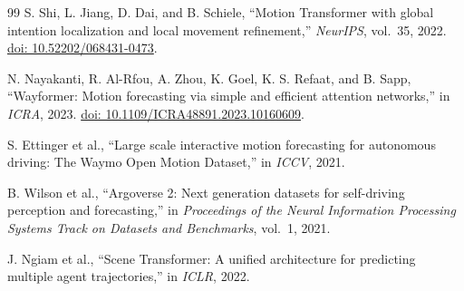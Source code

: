 \documentclass[11pt,letterpaper]{article}
\begin{document}
\begin{thebibliography}{99}
S. Shi, L. Jiang, D. Dai, and B. Schiele,
``Motion Transformer with global intention localization and local movement refinement,''
\emph{NeurIPS}, vol.~35, 2022.
\href{https://doi.org/10.52202/068431-0473}{doi: 10.52202/068431-0473}.

N. Nayakanti, R. Al-Rfou, A. Zhou, K. Goel, K. S. Refaat, and B. Sapp,
``Wayformer: Motion forecasting via simple and efficient attention networks,'' in \emph{ICRA}, 2023.
\href{https://doi.org/10.1109/ICRA48891.2023.10160609}{doi: 10.1109/ICRA48891.2023.10160609}.

S. Ettinger et al., ``Large scale interactive motion forecasting for autonomous driving: The Waymo Open Motion Dataset,'' in \emph{ICCV}, 2021.

B. Wilson et al., ``Argoverse 2: Next generation datasets for self-driving perception and forecasting,'' in \emph{Proceedings of the Neural Information Processing Systems Track on Datasets and Benchmarks}, vol.~1, 2021.

J. Ngiam et al., ``Scene Transformer: A unified architecture for predicting multiple agent trajectories,'' in \emph{ICLR}, 2022.

\end{thebibliography}
\end{document}
